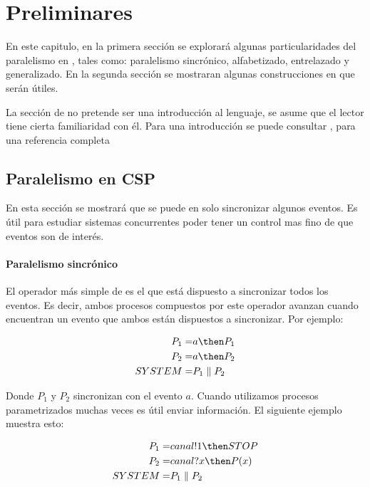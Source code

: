\chapter{Preliminares}

En este capitulo, en la primera sección se explorará algunas particularidades del paralelismo en \CSP, tales como: paralelismo sincrónico, alfabetizado, entrelazado y generalizado. En la segunda sección se mostraran algunas construcciones en \CSPm que serán útiles. 

La sección de \CSP no pretende ser una introducción al lenguaje, se asume que el lector tiene cierta familiaridad con él. Para una introducción se puede consultar \cite{Cristia:CSP}, para una referencia completa \cite{Roscoe:1997:TPC:550448}

\section{Paralelismo en CSP}

En esta sección se mostrará que se puede en \CSP solo sincronizar algunos eventos. Es útil para estudiar sistemas concurrentes poder tener un control mas fino de que eventos son de interés. 

\subsubsection*{Paralelismo sincrónico}

El operador más simple de \CSP es el que está dispuesto a sincronizar todos los eventos. Es decir, ambos procesos compuestos por este operador avanzan cuando encuentran un evento que ambos están dispuestos a sincronizar. Por ejemplo:

\begin{align*}
P_1 =& a \then P_1\\
P_2 =& a \then P_2 \\
SYSTEM =& P_1 \parallel P_2
\end{align*}

Donde $P_1$ y $P_2$ sincronizan con el evento $a$. Cuando utilizamos procesos parametrizados muchas veces es útil enviar información. El siguiente ejemplo muestra esto:

\begin{align*}
P_1 =& canal!1 \then STOP \\
P_2 =& canal?x \then P(x) \\
SYSTEM =& P_1 \parallel P_2 \\
\end{align*}

